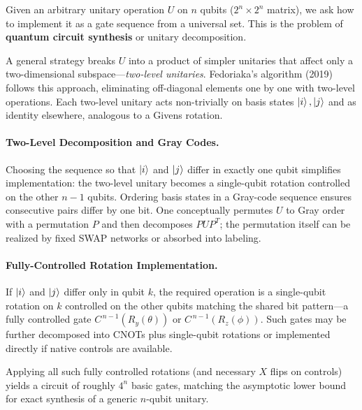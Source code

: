 Given an arbitrary unitary operation $U$ on $n$ qubits ($2^{n}\times2^{n}$ matrix), we ask how to implement it as a gate sequence from a universal set.\cite{Shende2006synthesis} This is the problem of \textbf{quantum circuit synthesis} or unitary decomposition.

A general strategy breaks $U$ into a product of simpler unitaries that affect only a two-dimensional subspace—\emph{two-level unitaries}.\cite{Reck1994optics} Fedoriaka's algorithm (2019) follows this approach, eliminating off-diagonal elements one by one with two-level operations.\cite{fedoriaka2025decomposition} Each two-level unitary acts non-trivially on basis states $\ket{i},\ket{j}$ and as identity elsewhere, analogous to a Givens rotation.\cite{Reck1994optics}

\paragraph{Two-Level Decomposition and Gray Codes.} 
Choosing the sequence so that $\ket{i}$ and $\ket{j}$ differ in exactly one qubit simplifies implementation: the two-level unitary becomes a single-qubit rotation controlled on the other $n-1$ qubits.\cite{Barenco1995elementary} Ordering basis states in a Gray-code sequence ensures consecutive pairs differ by one bit.\cite{Bullock2004gray} One conceptually permutes $U$ to Gray order with a permutation $P$ and then decomposes $PUP^T$; the permutation itself can be realized by fixed SWAP networks or absorbed into labeling.\cite{Bullock2004gray}

\paragraph{Fully-Controlled Rotation Implementation.} 
If $\ket{i}$ and $\ket{j}$ differ only in qubit $k$, the required operation is a single-qubit rotation on $k$ controlled on the other qubits matching the shared bit pattern—a fully controlled gate $C^{\,n-1}(R_y(\theta))$ or $C^{\,n-1}(R_z(\phi))$.\cite{fedoriaka2025decomposition} Such gates may be further decomposed into CNOTs plus single-qubit rotations or implemented directly if native controls are available.\cite{Barenco1995elementary}

Applying all such fully controlled rotations (and necessary $X$ flips on controls) yields a circuit of roughly $4^{n}$ basic gates, matching the asymptotic lower bound for exact synthesis of a generic $n$-qubit unitary.\cite{Shende2006synthesis}


